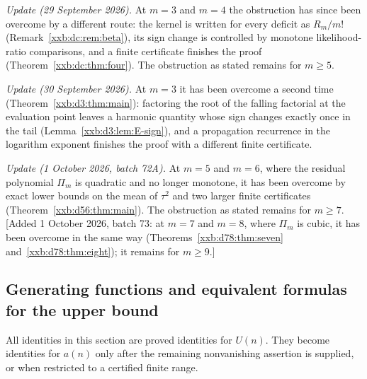 \documentclass[11pt,a4paper]{article}
\numberwithin{equation}{section}
\theoremstyle{definition}
\theoremstyle{remark}
\theoremstyle{plain}
\newcommand{\U}{U}
\begin{document}
\emph{Update (29 September 2026).}  At $m=3$ and $m=4$ the obstruction has
since been overcome by a different route: the kernel is written for every
deficit as $R_m/m!$ (Remark~\ref{xxb:dc:rem:beta}), its sign change is
controlled by monotone likelihood-ratio comparisons, and a finite certificate
finishes the proof (Theorem~\ref{xxb:dc:thm:four}).  The obstruction as stated
remains for $m\ge5$.

\emph{Update (30 September 2026).}  At $m=3$ it has been overcome a second
time (Theorem~\ref{xxb:d3:thm:main}): factoring the root of the falling
factorial at the evaluation point leaves a harmonic quantity whose sign
changes exactly once in the tail (Lemma~\ref{xxb:d3:lem:E-sign}), and a
propagation recurrence in the logarithm exponent finishes the proof with a
different finite certificate.

\emph{Update (1 October 2026, batch 72A).}  At $m=5$ and $m=6$, where the
residual polynomial $\Pi_m$ is quadratic and no longer monotone, it has been
overcome by exact lower bounds on the mean of $\tau^2$ and two larger finite
certificates (Theorem~\ref{xxb:d56:thm:main}).  The obstruction as stated
remains for $m\ge7$.  [Added 1 October 2026, batch 73: at $m=7$ and $m=8$, where $\Pi_m$ is cubic,
it has been overcome in the same way (Theorems~\ref{xxb:d78:thm:seven}
and~\ref{xxb:d78:thm:eight}); it remains for $m\ge9$.]

\subsection{Generating functions and equivalent formulas for the upper bound}
\label{xxb:sec:gf}
All identities in this section are proved identities for $\U(n)$.
They become identities for $a(n)$ only after the remaining nonvanishing
assertion is supplied, or when restricted to a certified finite range.
\end{document}
